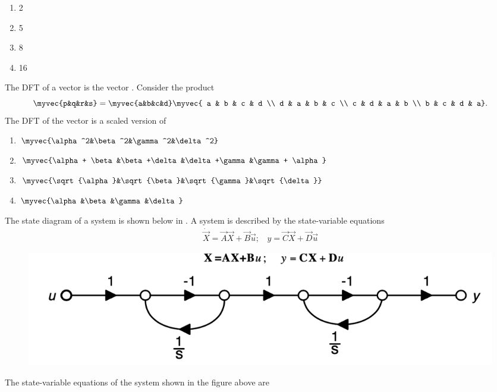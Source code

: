 \hfill {}
\begin{multicols}{4}
\begin{enumerate}
\item 2
\item 5
\item 8
\item 16
\end{enumerate}
\end{multicols}
\item The DFT of a vector  is the vector \myvec{\alpha&\beta&\gamma&\delta}. Consider the product
$$\myvec{p&q&r&s} = \myvec{a&b&c&d} 
\myvec{
a & b & c & d \\
d & a & b & c \\
c & d & a & b \\
b & c & d & a}.$$
The DFT of the vector  is a scaled version of
\hfill {}
\begin{multicols}{2}
\begin{enumerate}
\item $\myvec{\alpha^2&\beta^2&\gamma^2&\delta^2}$
\item $\myvec{\alpha+ \beta&\beta+\delta &\delta+\gamma&\gamma + \alpha}$
\item $\myvec{\sqrt{\alpha}&\sqrt{\beta}&\sqrt{\gamma}&\sqrt{\delta}}$
\item $\myvec{\alpha&\beta&\gamma&\delta}$
\end{enumerate}
\end{multicols}
\item The state diagram of a system is shown below in . A system is described by the state-variable equations
\begin{align*}
    \dot{\vec{X}} = \vec{A}\vec{X} + \vec{B}\vec{u}; \ \ \ \ y= \vec{C}\vec{X}+\vec{D}\vec{u}
\end{align*}
\begin{figure}[H]
    \centering
    \includegraphics[width=0.5\columnwidth]{GATE/2013/EC/figs/fig_23.png}
    \caption{}
    \label{fig:placeholder_23}
\end{figure}
The state-variable equations of the system shown in the figure above are
\hfill {}
